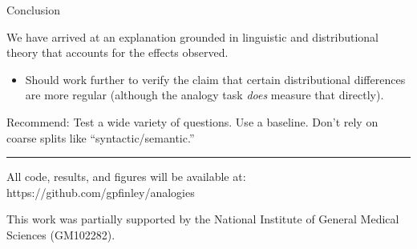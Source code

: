 \documentclass{beamer}
\begin{document}
\begin{frame}{Conclusion}

We have arrived at an explanation grounded in linguistic and distributional theory that accounts for the effects observed.
\begin{itemize}
\item Should work further to verify the claim that certain distributional differences are more regular (although the analogy task \emph{does} measure that directly).
\end{itemize}

\vspace{.3cm}
Recommend: Test a wide variety of questions. Use a baseline. Don't rely on coarse splits like ``syntactic/semantic.''


\vspace{.4cm}
\hrule
\vspace{.4cm}
\small
All code, results, and figures will be available at: https://github.com/gpfinley/analogies

\vspace{.3cm}
This work was partially supported by the National Institute of General Medical Sciences (GM102282).

\end{frame}

%
%
%
%
%
%
%
%
%
%




\end{document}
